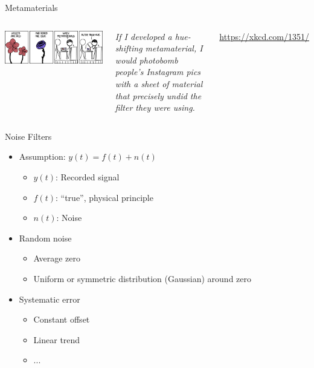 
\begin{frame}{Metamaterials}
%
\begin{columns}
\begin{center}
\includegraphics[width=\linewidth]{./gfx/05-xkcd-metamaterials}\\
\end{center}
%
\small
	\emph{If I developed a hue-shifting metamaterial, I would photobomb people's Instagram pics with a sheet of material that precisely undid the filter they were using.}

	\vspace{6pt}
	\url{https://xkcd.com/1351/}
\end{columns}
%
\end{frame}


\begin{frame}{Noise Filters}
%
\begin{itemize}
\item Assumption: $y(t) = f(t) + n(t)$
	\begin{itemize}
	\item $y(t)$: Recorded signal
	\item $f(t)$: \enquote{true}, physical principle
	\item $n(t)$: Noise
	\end{itemize}
\item Random noise
	\begin{itemize}
	\item Average zero
	\item Uniform or symmetric distribution (\zB Gaussian) around zero
	\end{itemize}
\item Systematic error
	\begin{itemize}
	\item Constant offset
	\item Linear trend
	\item ...
	\end{itemize}
\end{itemize}
%
\end{frame}

